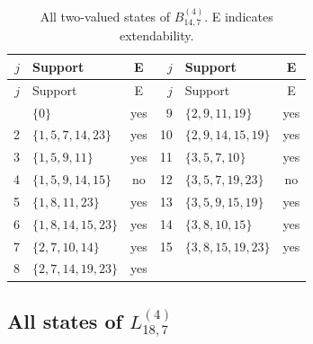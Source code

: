 \documentclass[aps,pra,reprint,superscriptaddress,longbibliography,nofootinbib,floatfix,10pt]{revtex4-2}
\theoremstyle{definition}
\begin{document}
\begingroup\footnotesize\setlength{\tabcolsep}{3pt}\setlength{\LTpre}{5pt}\setlength{\LTpost}{8pt}
\begin{longtable}{rlc@{\qquad}rlc}
\caption{All two-valued states of $B_{14,7}^{(4)}$. E indicates extendability.}\label{tab:states-4c}\\\toprule $j$ & Support & E & $j$ & Support & E\\\midrule\endfirsthead
\toprule $j$ & Support & E & $j$ & Support & E\\\midrule\endhead\bottomrule\endfoot
1 & $\{0\}$ & yes & 9 & $\{2,\allowbreak 9,\allowbreak 11,\allowbreak 19\}$ & yes\\
2 & $\{1,\allowbreak 5,\allowbreak 7,\allowbreak 14,\allowbreak 23\}$ & yes & 10 & $\{2,\allowbreak 9,\allowbreak 14,\allowbreak 15,\allowbreak 19\}$ & yes\\
3 & $\{1,\allowbreak 5,\allowbreak 9,\allowbreak 11\}$ & yes & 11 & $\{3,\allowbreak 5,\allowbreak 7,\allowbreak 10\}$ & yes\\
4 & $\{1,\allowbreak 5,\allowbreak 9,\allowbreak 14,\allowbreak 15\}$ & no & 12 & $\{3,\allowbreak 5,\allowbreak 7,\allowbreak 19,\allowbreak 23\}$ & no\\
5 & $\{1,\allowbreak 8,\allowbreak 11,\allowbreak 23\}$ & yes & 13 & $\{3,\allowbreak 5,\allowbreak 9,\allowbreak 15,\allowbreak 19\}$ & yes\\
6 & $\{1,\allowbreak 8,\allowbreak 14,\allowbreak 15,\allowbreak 23\}$ & yes & 14 & $\{3,\allowbreak 8,\allowbreak 10,\allowbreak 15\}$ & yes\\
7 & $\{2,\allowbreak 7,\allowbreak 10,\allowbreak 14\}$ & yes & 15 & $\{3,\allowbreak 8,\allowbreak 15,\allowbreak 19,\allowbreak 23\}$ & yes\\
8 & $\{2,\allowbreak 7,\allowbreak 14,\allowbreak 19,\allowbreak 23\}$ & yes &  &  & \\
\end{longtable}\endgroup
{}\subsection{All states of \texorpdfstring{$L_{18,7}^{(4)}$}{gadget 4d}}
\begingroup\footnotesize\setlength{\tabcolsep}{3pt}\setlength{\LTpre}{5pt}\setlength{\LTpost}{8pt}
\end{document}
